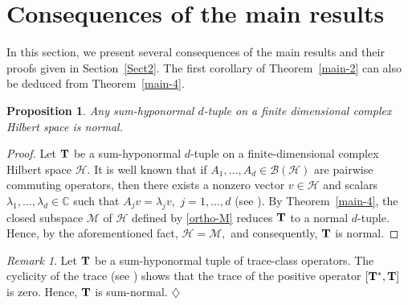 \documentclass[10pt, a4paper, oneside, reqno]{amsproc}
\numberwithin{equation}{section}
\newtheorem{proposition}[theorem]{Proposition}
\theoremstyle{remark}
\newtheorem{remark}[theorem]{Remark}
\theoremstyle{definition}
\newcommand*{\Le}{\leqslant}
\begin{document}


\section{Consequences of the main results \label{Sect3}}

In this section, we present several consequences of the main results and their proofs given in Section~\ref{Sect2}. The first corollary of Theorem~\ref{main-2} can also be deduced from Theorem~\ref{main-4}.
\begin{proposition} \label{main-1}
Any sum-hyponormal $d$-tuple on a finite dimensional complex Hilbert space is normal.
\end{proposition}
\begin{proof} Let ${\bf T}$ be a sum-hyponormal $d$-tuple on a finite-dimensional complex Hilbert space $\mathcal H$. It is well known that if 
$A_1, \ldots, A_d \in {\mathcal B}(\mathcal H)$ are pairwise commuting operators, then there exists a nonzero vector $v \in \mathcal H$ and scalars $\lambda_1,\ldots,\lambda_d \in \mathbb{C}$ such that
$A_j v = \lambda_j v,$ $j=1, \ldots, d$ (see \cite{CT1979}).
By Theorem~\ref{main-4}, the closed subspace $\mathcal M$ of $\mathcal H$ defined by \eqref{ortho-M} reduces ${\bf T}$ to a normal $d$-tuple. Hence, by the aforementioned fact, $\mathcal H=\mathcal M,$ and consequently, ${\bf T}$ is normal. 
\end{proof}
\begin{remark} \label{cyclicity-trace}
Let ${\bf T}$ be a sum-hyponormal tuple of trace-class operators.
The cyclicity of the trace (see \cite[Theorem 3.6.7]{S2015}) shows that the trace of the positive operator $[{\bf T}^*, {\bf T}]$ is zero. Hence, ${\bf T}$ is sum-normal. \hfill $\diamondsuit$
\end{remark}
\end{document}
